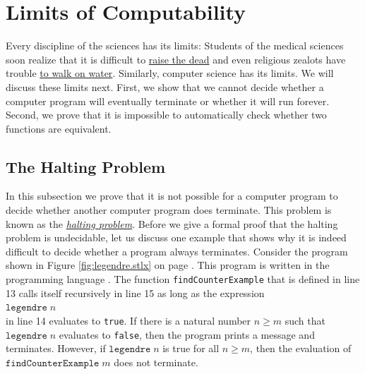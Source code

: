 \chapter{Limits of Computability}
Every discipline of the sciences has its limits: Students of the medical sciences soon realize that
it is difficult to \href{http://www.wowhead.com/spell=61999}{raise the dead} and even religious zealots
have trouble \href{http://www.youtube.com/watch?v=RUMX_b_m3Js}{to walk on water}.  Similarly,
computer science has its limits.  We will discuss 
these limits next.  First, we show that we cannot decide whether a computer program will eventually
terminate or whether it will run forever.  
Second, we prove that it is impossible to automatically check whether two functions are equivalent.


\section{The Halting Problem}
In this subsection we prove that it is not possible for a computer program to decide whether 
another computer program does terminate.  This problem is known as the 
\href{http://en.wikipedia.org/wiki/Halting_problem}{\emph{halting problem}}.
Before we give a formal proof that the halting problem is undecidable, let us
discuss one example that shows why it is indeed difficult to decide whether a program always
terminates.  Consider the program shown in Figure \ref{fig:legendre.stlx} on page
\pageref{fig:legendre.stlx}.  This program is written in the programming language
\href{https://fsharp.org}{\Fsharp}.  The function \texttt{findCounterExample} that is
defined in line 13 calls itself recursively in line 15 as long as the expression
\\[0.2cm]
\hspace*{1.3cm}
$\mathtt{legendre}\;n$
\\[0.2cm]
in line 14 evaluates to \texttt{true}.  If there is a natural number $n \geq m$ such that 
$\mathtt{legendre}\;n$ evaluates to \texttt{false}, then the program prints a message and terminates.   However, if 
$\mathtt{legendre}\;n$ is true for all $n \geq m$, then the evaluation of $\mathtt{findCounterExample}\;m$ 
does not terminate.

